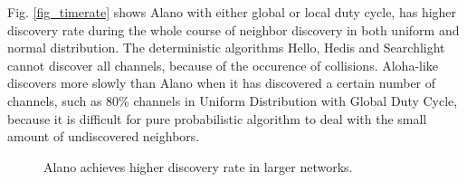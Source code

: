 Fig. \ref{fig_timerate} shows Alano with either global or local duty cycle, has higher discovery rate during the whole course of neighbor discovery in both uniform and normal distribution. The deterministic algorithms Hello, Hedis and Searchlight cannot discover all channels, because of the occurence of collisions. Aloha-like discovers more slowly than Alano when it has discovered a certain number of channels, such as $80\%$ channels in Uniform Distribution with Global Duty Cycle, because it is difficult for pure probabilistic algorithm to deal with the small amount of   undiscovered neighbors.


\begin{figure}[!t]

\hspace{0.01in}
\hspace{0.01in}
\hspace{0.01in}
\caption{Alano achieves higher discovery rate in larger networks.}
\label{fig_timerate_large}
\end{figure}

